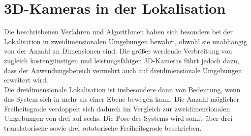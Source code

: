 


\section{3D-Kameras in der Lokalisation}
Die beschriebenen Verfahren und Algorithmen haben sich besonders bei der Lokalisation in zweidimensionalen Umgebungen bewährt, obwohl sie unabhängig von der Anzahl an Dimensionen sind. Die größer werdende Verbreitung von zugleich kostengünstigen und leistungsfähigen 3D-Kameras 
führt jedoch dazu, dass der Anwendungsbereich vermehrt auch auf dreidimensionale Umgebungen erweitert wird.\\
Die dreidimensionale Lokalisation ist insbesondere dann von Bedeutung, wenn das System sich in mehr als einer Ebene bewegen kann. Die Anzahl möglicher Freiheitsgrade verdoppelt sich dadurch im Vergleich zur zweidimensionalen Umgebungen von drei auf sechs. Die Pose des Systems wird somit über drei translatorische sowie drei rotatorische Freiheitsgrade beschrieben.\\


